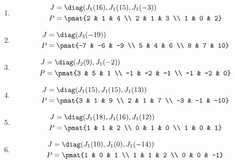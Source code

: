 \begin{enumerate}
\item

\begin{align*}
J &= \diag(J_{1}(16), J_{1}(15), J_{1}(-3))\\
P &= \pmat{2 & 1 & 4 \\ 2 & 1 & 3 \\ 1 & 0 & 2}
\end{align*}

\item

\begin{align*}
J &= \diag(J_{3}(-19))\\
P &= \pmat{-7 & -6 & -9 \\ 5 & 4 & 6 \\ 8 & 7 & 10}
\end{align*}

\item

\begin{align*}
J &= \diag(J_{2}(9), J_{1}(-2))\\
P &= \pmat{3 & 5 & 1 \\ -1 & -2 & -1 \\ -1 & -2 & 0}
\end{align*}

\item

\begin{align*}
J &= \diag(J_{1}(15), J_{1}(15), J_{1}(13))\\
P &= \pmat{3 & 1 & 9 \\ 2 & 1 & 7 \\ -3 & -1 & -10}
\end{align*}

\item

\begin{align*}
J &= \diag(J_{1}(18), J_{1}(16), J_{1}(12))\\
P &= \pmat{1 & 1 & 2 \\ 0 & 1 & 0 \\ 1 & 0 & 1}
\end{align*}

\item

\begin{align*}
J &= \diag(J_{1}(10), J_{1}(0), J_{1}(-14))\\
P &= \pmat{1 & 0 & 1 \\ 1 & 1 & 2 \\ 0 & 0 & -1}
\end{align*}


\end{enumerate}
